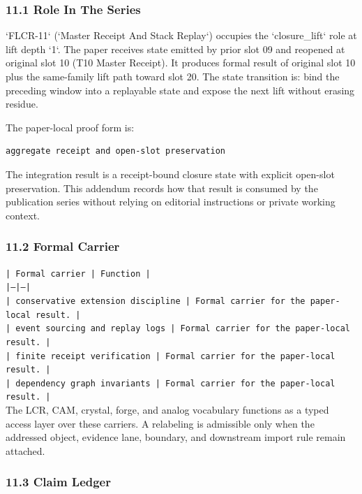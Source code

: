 \documentclass[11pt]{article}
\begin{document}
\subsubsection*{11.1 Role In The Series}

`FLCR-11` (`Master Receipt And Stack Replay`) occupies the `closure\_lift` role at lift depth `1`.
The paper receives state emitted by prior slot 09 and reopened at original slot 10 (T10 Master Receipt). It produces formal result of original slot 10 plus the same-family lift path toward slot 20. The state transition is:
bind the preceding window into a replayable state and expose the next lift without erasing residue.

The paper-local proof form is:

\begin{verbatim}
aggregate receipt and open-slot preservation
\end{verbatim}

The integration result is a receipt-bound closure state with explicit open-slot preservation. This addendum records how that result is
consumed by the publication series without relying on editorial instructions or
private working context.

\subsubsection*{11.2 Formal Carrier}

\noindent\texttt{| Formal carrier | Function |}\\
\noindent\texttt{|---|---|}\\
\noindent\texttt{| conservative extension discipline | Formal carrier for the paper-local result. |}\\
\noindent\texttt{| event sourcing and replay logs | Formal carrier for the paper-local result. |}\\
\noindent\texttt{| finite receipt verification | Formal carrier for the paper-local result. |}\\
\noindent\texttt{| dependency graph invariants | Formal carrier for the paper-local result. |}\\

The LCR, CAM, crystal, forge, and analog vocabulary functions as a typed access
layer over these carriers. A relabeling is admissible only when the addressed
object, evidence lane, boundary, and downstream import rule remain attached.

\subsubsection*{11.3 Claim Ledger}
\end{document}
